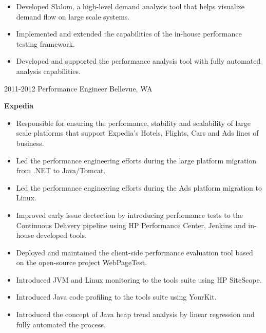 \begin{entrylist}
{\begin{itemize}
        \item Developed Slalom, a high-level demand analysis tool that helps visualize demand flow on large scale systems.
        \item Implemented and extended the capabilities of the in-house performance testing framework.
        \item Developed and supported the performance analysis tool with fully automated analysis capabilities.
      \end{itemize}
    }
  \entry
    {2011-2012}
    {Performance Engineer}
    {Bellevue, WA}
    {
      \textbf{Expedia}
      \begin{itemize}
        \item Responsible for ensuring the performance, stability and scalability of large scale platforms that support Expedia's Hotels, Flights, Cars and Ads lines of business.
        \item Led the performance engineering efforts during the large platform migration from .NET to Java/Tomcat.
        \item Led the performance engineering efforts during the Ads platform migration to Linux.
        \item Improved early issue dectection by introducing performance tests to the Continuous Delivery pipeline using HP Performance Center, Jenkins and in-house developed tools.
        \item Deployed and maintained the client-side performance evaluation tool based on the open-source project WebPageTest.
        \item Introduced JVM and Linux monitoring to the tools suite using HP SiteScope.
        \item Introduced Java code profiling to the tools suite using YourKit.
        \item Introduced the concept of Java heap trend analysis by linear regression and fully automated the process.

\end{itemize}}
\end{entrylist}
